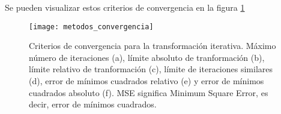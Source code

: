 Se pueden visualizar estos criterios de convergencia en la figura \ref{fig:metodos_convergencia}

\begin{figure}
\centering
\texttt{[image: metodos\_convergencia]}
\caption{Criterios de convergencia para la transformación iterativa. Máximo número de iteraciones (a), límite absoluto de tranformación (b), límite relativo de tranformación (c), límite de iteraciones similares (d), error de mínimos cuadrados relativo (e) y error de mínimos cuadrados absoluto (f). MSE significa Minimum Square Error, es decir, error de mínimos cuadrados.}\label{fig:metodos_convergencia}
\end{figure}




